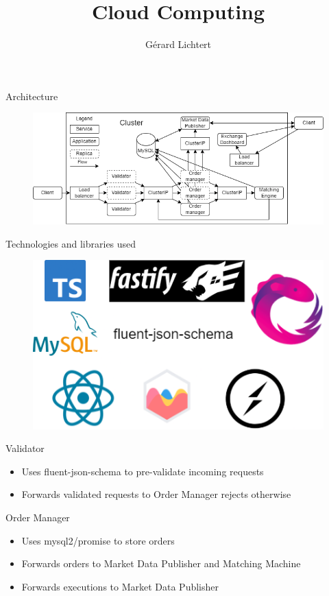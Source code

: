 \documentclass{beamer}
\title{Cloud Computing}
\author{Gérard Lichtert}
\begin{document}
\frame{\maketitle} %
\begin{frame}{Architecture}
	\begin{figure}
		\includegraphics[width=\textwidth]{architecture.drawio.png}
	\end{figure}
\end{frame}
\begin{frame}{Technologies and libraries used}
	\begin{figure}
		\includegraphics[width=\textwidth]{technologies.drawio.png}
	\end{figure}
\end{frame}
\begin{frame}{Validator}
	\begin{itemize}
		\item Uses fluent-json-schema to pre-validate incoming requests
		\item Forwards validated requests to Order Manager rejects otherwise
	\end{itemize}
\end{frame}
\begin{frame}{Order Manager}
	\begin{itemize}
		\item Uses mysql2/promise to store orders
		\item Forwards orders to Market Data Publisher and Matching Machine
		\item Forwards executions to Market Data Publisher
	\end{itemize}
\end{frame}
\end{document}
